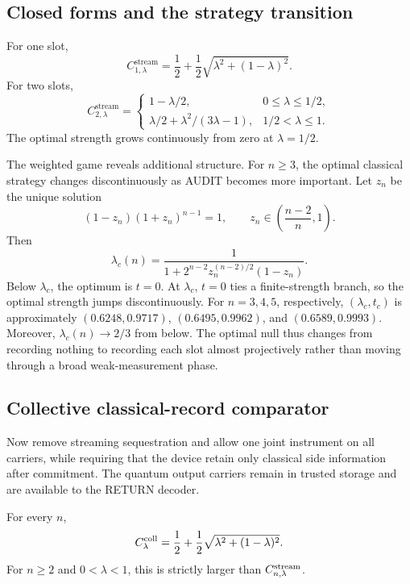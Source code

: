 \subsection{Closed forms and the strategy transition}

For one slot,
\[
C^{\mathrm{stream}}_{1,\lambda}
=\frac12+\frac12\sqrt{\lambda^2+(1-\lambda)^2}.
\]
For two slots,
\begin{equation}
C^{\mathrm{stream}}_{2,\lambda}=
\begin{cases}
1-\lambda/2,&0\leq\lambda\leq1/2,\\[1mm]
\lambda/2+\lambda^2/(3\lambda-1),&1/2<\lambda\leq1.
\end{cases}
\label{eq:n2}
\end{equation}
The optimal strength grows continuously from zero at $\lambda=1/2$.

The weighted game reveals additional structure. For $n\geq3$, the optimal classical strategy changes discontinuously as AUDIT becomes more important. Let $z_n$ be the unique solution
\begin{equation}
(1-z_n)(1+z_n)^{n-1}=1,\qquad
z_n\in\left(\frac{n-2}{n},1\right).
\label{eq:zn}
\end{equation}
Then
\begin{equation}
\lambda_c(n)=
\frac{1}{1+2^{n-2}z_n^{(n-2)/2}(1-z_n)}.
\label{eq:lambdac}
\end{equation}
Below $\lambda_c$, the optimum is $t=0$. At $\lambda_c$, $t=0$ ties a finite-strength branch, so the optimal strength jumps discontinuously. For $n=3,4,5$, respectively, $(\lambda_c,t_c)$ is approximately $(0.6248,0.9717)$, $(0.6495,0.9962)$, and $(0.6589,0.9993)$. Moreover, $\lambda_c(n)\to2/3$ from below. The optimal null thus changes from recording nothing to recording each slot almost projectively rather than moving through a broad weak-measurement phase.

\subsection{Collective classical-record comparator}

Now remove streaming sequestration and allow one joint instrument on all carriers, while requiring that the device retain only classical side information after commitment. The quantum output carriers remain in trusted storage and are available to the RETURN decoder.

\begin{proposition}
For every $n$,
\begin{equation}
C^{\mathrm{coll}}_{\lambda}=\frac12+\frac12\sqrt{\lambda^2+(1-\lambda)^2}.
\label{eq:collective}
\end{equation}
For $n\geq2$ and $0<\lambda<1$, this is strictly larger than $C^{\mathrm{stream}}_{n,\lambda}$.
\end{proposition}

